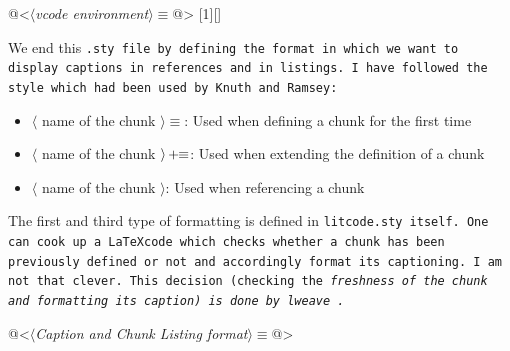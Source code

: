 \begin{code}
@<$\langle$\textit{vcode environment}$\rangle\equiv$@>
[1][]{
}{}
\end{code}

We end this \tt .sty \rm file by defining the format in which we want to display captions in references and in
listings. I have followed the style which had been used by Knuth and Ramsey:

\begin{itemize}
    \item $\langle$ name of the chunk $\rangle \equiv$: Used when defining a chunk for the first time
    \item $\langle$ name of the chunk $\rangle \thinspace +\!\!\equiv$: Used when extending the definition of
    a chunk
    \item $\langle$ name of the chunk $\rangle$: Used when referencing a chunk
\end{itemize}

The first and third type of formatting is defined in \tt litcode.sty \rm itself. One can cook up a \LaTeX code
which checks whether a chunk has been previously defined or not and accordingly format its captioning. I am
not that clever. This decision (checking the \it freshness \rm of the chunk and formatting its caption) is
done by \tt lweave \rm. 

\begin{code}
@<$\langle$\textit{Caption and Chunk Listing format}$\rangle\equiv$@>
{
}

\captionsetup[lstlisting]{
    format=codecaptionformat,
    justification=raggedright,
    singlelinecheck=off,
    skip=-\baselineskip
}

\makeatletter
\renewcommand\l@lstlisting[2]{\@dottedtocline{1}{0em}{2.3em}{\textit{#1}}{#2}}
\makeatother

\newcommand{\coderef}[1]{$\langle$\textit{\nameref{#1}}$\rangle$}
\end{code}

